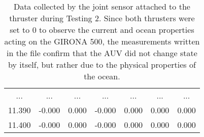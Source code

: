 \documentclass[]{article}
\begin{document}
\begin{table}[H]
\begin{center}
\begin{tabular}{ccccccc}
			\footnotesize ... & \footnotesize ... & \footnotesize ... & \footnotesize ...& \footnotesize ... & \footnotesize ... & \footnotesize ...  \\
			
			\footnotesize 11.390 & \footnotesize -0.000 & \footnotesize 0.000 & \footnotesize -0.000 & \footnotesize 0.000 & \footnotesize 0.000 & \footnotesize 0.000 \\
			
			\footnotesize 11.400 & \footnotesize -0.000 & \footnotesize 0.000 & \footnotesize -0.000 & \footnotesize 0.000 & \footnotesize 0.000 & \footnotesize 0.000 \\
										
			
		\bottomrule
	\end{tabular}
		\caption{Data collected by the joint sensor attached to the thruster during Testing 2. Since both thrusters were set to 0 to observe the current and ocean properties acting on the GIRONA 500, the measurements written in the file confirm that the AUV did not change state by itself, but rather due to the physical properties of the ocean.}
	\end{center}
\end{table}

\newpage
\end{document}
